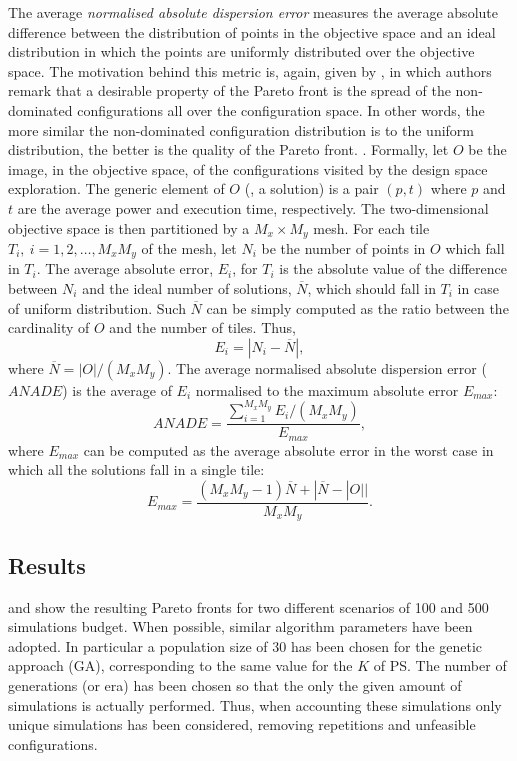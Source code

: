 The average \emph{normalised absolute dispersion error} measures
the average absolute difference between the distribution of points in
the objective space and an ideal distribution in which the points are
uniformly distributed over the objective space. 
The motivation behind this metric is, again, given by \cite{zitzler_ec00}, in which authors remark that a desirable property of the Pareto front is the spread of the non-dominated configurations all over the configuration space. In other words, the more similar the non-dominated configuration distribution is to the uniform distribution, the better is the quality of the Pareto front.
.
Formally, let $O$ be
the image, in the objective space, of the configurations visited by
the design space exploration. The generic element of $O$ (\ie, a
solution) is a pair $(p,t)$ where $p$ and $t$ are the average power
and execution time, respectively. The two-dimensional objective space
is then partitioned by a $M_x \times M_y$ mesh. For each tile $T_i,
\ i=1, 2, \ldots, M_xM_y$ of the mesh, let $N_i$ be the number
of points in $O$ which fall in $T_i$. The average absolute error, $E_i$, for
$T_i$ is the absolute value of the difference between $N_i$ and the
ideal number of solutions, $\overline{N}$, which should fall in $T_i$
in case of uniform distribution. Such $\overline{N}$ can be simply
computed as the ratio between the cardinality of $O$ and the number of
tiles. Thus,
\[ E_i = |N_i - \overline{N}|, \]
where $\overline{N} = |O| / (M_x M_y)$. The average
normalised absolute dispersion error ($ANADE$) is the average of $E_i$
normalised to the maximum absolute error $E_{max}$:
\[ ANADE = \frac{\sum_{i=1}^{M_xM_y} E_i/(M_xM_y)}{E_{max}}, \]
where $E_{max}$ can be computed as the average absolute error in the worst
case in which all the solutions fall in a single tile:
\[ E_{max} = \frac{(M_x M_y - 1) \overline{N} + |\overline{N} -
    |O|| }{M_x M_y}. \] 


\subsection{Results}

 and  show the resulting Pareto fronts for two
different scenarios of 100 and 500 simulations budget. When possible,
similar algorithm parameters have been adopted. In particular a
population size of 30 has been chosen for the genetic approach (GA), corresponding to the
same value for the $K$ of PS. The number of generations (or era)
has been chosen so that the only the given amount of simulations is
actually performed. Thus, when accounting these simulations only unique simulations
has been considered, removing repetitions and unfeasible
configurations.


